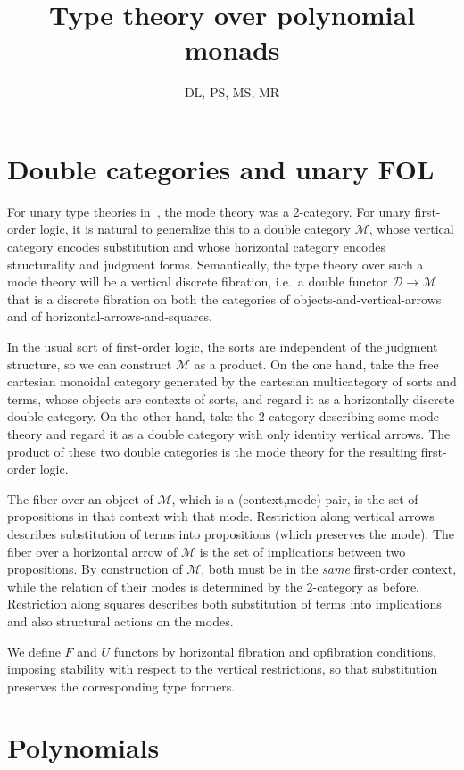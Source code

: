 \documentclass{article}
\title{Type theory over polynomial monads}
\author{DL, PS, MS, MR}
\theoremstyle{definition}
\def\M{\mathcal{M}}
\def\D{\mathcal{D}}
\begin{document}
\maketitle

\section{Double categories and unary FOL}
\label{sec:double-categories}

For unary type theories in~\cite{ls:1var-adjoint-logic}, the mode theory was a 2-category.
For unary first-order logic, it is natural to generalize this to a double category $\M$, whose vertical category encodes substitution and whose horizontal category encodes structurality and judgment forms.
Semantically, the type theory over such a mode theory will be a vertical discrete fibration, i.e.\ a double functor $\D\to\M$ that is a discrete fibration on both the categories of objects-and-vertical-arrows and of horizontal-arrows-and-squares.

In the usual sort of first-order logic, the sorts are independent of the judgment structure, so we can construct $\M$ as a product.
On the one hand, take the free cartesian monoidal category generated by the cartesian multicategory of sorts and terms, whose objects are contexts of sorts, and regard it as a horizontally discrete double category.
On the other hand, take the 2-category describing some mode theory and regard it as a double category with only identity vertical arrows.
The product of these two double categories is the mode theory for the resulting first-order logic.

The fiber over an object of $\M$, which is a (context,mode) pair, is the set of propositions in that context with that mode.
Restriction along vertical arrows describes substitution of terms into propositions (which preserves the mode).
The fiber over a horizontal arrow of $\M$ is the set of implications between two propositions.
By construction of $\M$, both must be in the \emph{same} first-order context, while the relation of their modes is determined by the 2-category as before.
Restriction along squares describes both substitution of terms into implications and also structural actions on the modes.

We define $F$ and $U$ functors by horizontal fibration and opfibration conditions, imposing stability with respect to the vertical restrictions, so that substitution preserves the corresponding type formers.


\section{Polynomials}
\label{sec:polynomials}
\end{document}
